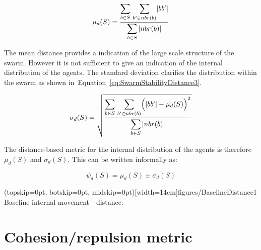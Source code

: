 \documentclass{ieeeaccess}
\begin{document}
\begin{equation}
\label{eq:SwarmStabilityDistance2}
\mu_d(S) = \frac{\mathlarger{\sum_{b \in S}}~\mathlarger{\sum_{b' \in nbr(b)}}|bb'|}{\mathlarger{\sum_{b \in S}|nbr(b)|}}
\end{equation}

The mean distance provides a indication of the large scale structure of the
swarm. However it is not sufficient to give an indication of the internal
distribution of the agents. The standard deviation clarifies the distribution
within the swarm as shown in~Equation~\ref{eq:SwarmStabilityDistance3}. 


\begin{equation}
\label{eq:SwarmStabilityDistance3}
\sigma_d(S) = \sqrt{\frac{\mathlarger{\sum_{b \in S}}~\mathlarger{\sum_{b' \in nbr(b)}}\Big(|bb'| - \mu_d(S)\Big)^2}{\mathlarger{\sum_{b \in S}|nbr(b)|}}}
\end{equation}

The distance-based metric for the internal distribution of the agents is
therefore $\mu_d(S)$ and $\sigma_d(S)$. This can be written informally as:

\begin{equation}
\label{eq:SwarmDistanceMetric}
\psi_d(S) = \mu_d(S)\pm \sigma_d(S)
\end{equation}

\Figure[t!](topskip=0pt, botskip=0pt,
midskip=0pt)[width=14cm]{figures/BaselineDistance1} {Baseline internal movement
- distance.\label{coord:BaselineDistance1}}


\section{Cohesion/repulsion metric}\label{Section:MagnitudeDynamics}
\end{document}
